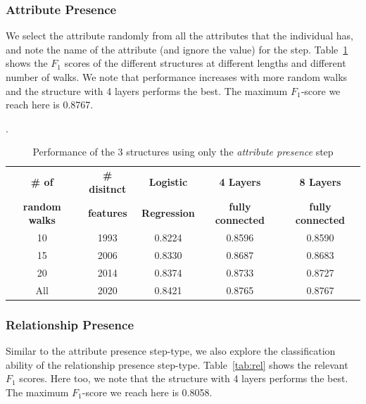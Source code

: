 \documentclass[runningheads,a4paper]{IEEEtran}
\begin{document}
\subsubsection{Attribute Presence} 
We select the attribute randomly from all the attributes that the individual has, and note the name of the attribute (and ignore the value) for the step. Table~\ref{tab:attr} shows the $F_1$ scores of the different structures at different lengths and different number of walks. We note that performance increases with more random walks and the structure with 4 layers performs the best. The maximum $F_1$-score we reach here is 0.8767.

\begin{table}[h]
\centering
\caption{Performance of the 3 structures using only the \textit{attribute presence} step}
\label{tab:attr}.
  \begin{tabular}{ | c | c | c | c | c | }
    \hline
    \textbf{\# of}  & \textbf{\# disitnct} & \textbf{Logistic } & \textbf{4 Layers} & \textbf{8 Layers} \\
    \textbf{random walks} &\textbf{features} &\textbf{ Regression} & \textbf{fully connected} & \textbf{fully connected}\\
    \hline
    10 & 1993 & 0.8224 & 0.8596 & 0.8590\\
    \hline
    15 & 2006 & 0.8330 &0.8687 & 0.8683\\
    \hline
    20 & 2014 & 0.8374  & 0.8733 & 0.8727 \\
    \hline
    All & 2020 & 0.8421 & 0.8765 & 0.8767\\
    \hline
  \end{tabular}
\end{table}

\subsubsection{Relationship Presence} 
Similar to the attribute presence step-type, we also explore the classification ability of the relationship presence step-type. Table~\ref{tab:rel} shows the relevant $F_1$ scores. Here too, we note that the structure with 4 layers performs the best. The maximum $F_1$-score we reach here is 0.8058.
\end{document}
